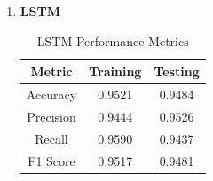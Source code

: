 \documentclass[12pt]{article}
\begin{document}
	\begin{enumerate}
		\item \textbf{LSTM} \\
		\begin{table}[H]
			\vspace{1 cm}
			\centering
			\caption{LSTM Performance Metrics}
			\vspace{0.25 cm}
			\begin{tabular}{|c|c|c|}
				\hline
				\textbf{Metric} & \textbf{Training} & \textbf{Testing} \\
				\hline
				Accuracy & 0.9521  & 0.9484 \\ \hline
				Precision & 0.9444 & 0.9526 \\ \hline
				Recall & 0.9590 & 0.9437 \\ \hline
				F1 Score & 0.9517  & 0.9481 \\ \hline
			\end{tabular}
			\label{tab:LSTM_METRICS}
		\end{table}
		

\end{enumerate}
\end{document}
